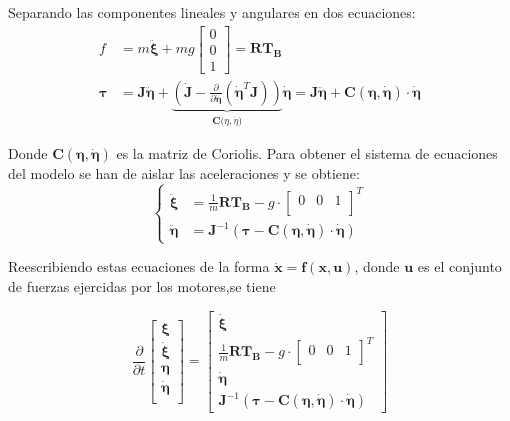 \documentclass[twoside]{article}
\begin{document}
Separando las componentes lineales y angulares en dos ecuaciones:
\begin{align}
f & = m \pmb{\ddot{\xi}} + mg \left[ \begin{array}{c}
0 \\
0 \\
1
\end{array} \right] =\pmb{R}\pmb{T_B}\\
\pmb{\tau} & =\pmb{J} \pmb{\ddot{\eta}} +  \underbrace{\left( \pmb{\dot{J}} - \frac{\partial}{\partial \pmb{\dot{\eta}}}(\pmb{\dot{\eta}}^{T}\pmb{J})\right)}_{\pmb{C(}\eta,\dot{\eta}\pmb{)}} \pmb{\dot{\eta}} =\pmb{J} \pmb{\ddot{\eta}} +  \pmb{C(\eta,\dot{\eta})}\cdot\pmb{\dot{\eta}} 
\end{align}

Donde $\pmb{C(\eta,\dot{\eta})}$ es la matriz de Coriolis. 
Para obtener el sistema de ecuaciones del modelo se han de aislar las aceleraciones y se obtiene:
\begin{equation}
\begin{cases}
\pmb{\ddot{\xi}} & =\frac{1}{m}\pmb{R}\pmb{T_{B}} - g \cdot \left[ \begin{array}{ccc}
0 & 0 & 1\\
\end{array} \right]^{T} \\
\pmb{\ddot{\eta}} & =\pmb{J}^{-1} \left( \pmb{\tau} - \pmb{C(\eta,\dot{\eta})}\cdot\pmb{\dot{\eta}}  \right)
\end{cases}
\label{eq:system}
\end{equation}

Reescribiendo estas ecuaciones de la forma $\pmb{\dot{x}}=\pmb{f(x,u)}$, donde $\pmb{u}$ es el conjunto de fuerzas ejercidas por los motores,se tiene 

\begin{equation}
\frac{\partial}{\partial t}\left[ \begin{array}{l}
\pmb{\xi} \\
\pmb{\dot{\xi}} \\
\pmb{\eta} \\
\pmb{\dot{\eta}} \\
\end{array} \right] =\left[ \begin{array}{l}
\pmb{\dot{\xi}} \\
\frac{1}{m}\pmb{R}\pmb{T_{B}} - g \cdot \left[ \begin{array}{ccc}
0 & 0 & 1 \\
\end{array} \right]^{T} \\
\pmb{\dot{\eta}} \\
\pmb{J}^{-1} \left( \pmb{\tau} - \pmb{C(\eta,\dot{\eta})}\cdot\pmb{\dot{\eta}} \right)
\end{array} \right]
\end{equation}
\end{document}
